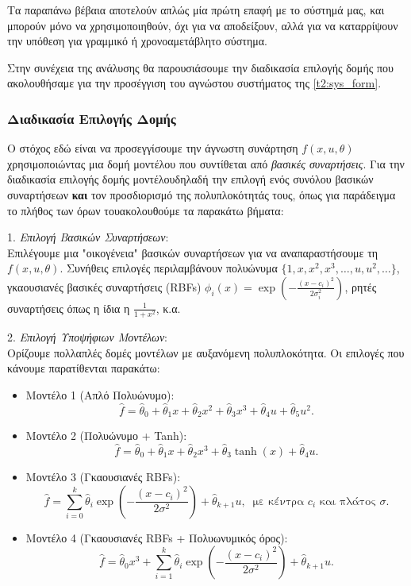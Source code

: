 \documentclass[12pt]{article} %
\numberwithin{equation}{section}  %
\begin{document}
Τα παραπάνω βέβαια αποτελούν απλώς μία πρώτη επαφή με το σύστημά μας, και μπορούν μόνο να χρησιμοποιηθούν, όχι για να αποδείξουν, αλλά για να 
καταρρίψουν την υπόθεση για γραμμικό ή χρονοαμετάβλητο σύστημα. 

Στην συνέχεια της ανάλυσης θα παρουσιάσουμε την διαδικασία επιλογής δομής που ακολουθήσαμε για την προσέγγιση του αγνώστου συστήματος της \eqref{t2:sys_form}.


\subsubsection{Διαδικασία Επιλογής Δομής}

Ο στόχος εδώ είναι να προσεγγίσουμε την άγνωστη συνάρτηση \(f(x, u, \theta)\) χρησιμοποιώντας μια δομή μοντέλου που συντίθεται από \textit{βασικές συναρτήσεις}. 
Για την διαδικασία επιλογής δομής μοντέλου\textemdash δηλαδή την επιλογή ενός συνόλου βασικών συναρτήσεων \textbf{και} τον προσδιορισμό της πολυπλοκότητάς τους, όπως για παράδειγμα το πλήθος των όρων του\textemdash ακολουθούμε τα παρακάτω βήματα:

1. \textit{Επιλογή Βασικών Συναρτήσεων}: \\
Επιλέγουμε μια "οικογένεια" βασικών συναρτήσεων για να αναπαραστήσουμε τη \(f(x, u, \theta)\). 
Συνήθεις επιλογές περιλαμβάνουν 
πολυώνυμα \( \{1, x, x^2, x^3, \dots, u, u^2, \dots\} \), 
γκαουσιανές βασικές συναρτήσεις (RBFs) \(\phi_i(x) = \exp\left(-\frac{(x - c_i)^2}{2\sigma_i^2}\right)\),
ρητές συναρτήσεις όπως η ίδια η \(\frac{1}{1 + x^2}\), κ.α.


2. \textit{Επιλογή Υποψήφιων Μοντέλων}: \\
Ορίζουμε πολλαπλές δομές μοντέλων με αυξανόμενη πολυπλοκότητα. Οι επιλογές που κάνουμε παρατίθενται παρακάτω:
\begin{itemize}[noitemsep, nolistsep]
    \item Μοντέλο 1 (Απλό Πολυώνυμο): 
    $$\hat{f} = \hat{\theta}_0 + \hat{\theta}_1 x + \hat{\theta}_2 x^2 + \hat{\theta}_3 x^3 + \hat{\theta}_4 u + \hat{\theta}_5 u^2.$$
    
    \item Μοντέλο 2 (Πολυώνυμο + Tanh): 
    $$\hat{f} = \hat{\theta}_0 + \hat{\theta}_1 x + \hat{\theta}_2 x^3 + \hat{\theta}_3 \tanh(x) + \hat{\theta}_4 u.$$
    
    \item Μοντέλο 3 (Γκαουσιανές RBFs): 
    $$\hat{f} = \sum_{i=0}^k \hat{\theta}_i \exp\left(-\frac{(x - c_i)^2}{2\sigma^2}\right) + \hat{\theta}_{k+1} u,\ \text{ με κέντρα \(c_i\) και πλάτος \(\sigma\)}.$$

    \item Μοντέλο 4 (Γκαουσιανές RBFs + Πολυωνυμικός όρος): 
    $$\hat{f} = \hat{\theta}_0 x^3 + \sum_{i=1}^k \hat{\theta}_i \exp\left(-\frac{(x - c_i)^2}{2\sigma^2}\right) + \hat{\theta}_{k+1} u.$$
\end{itemize}
\end{document}
